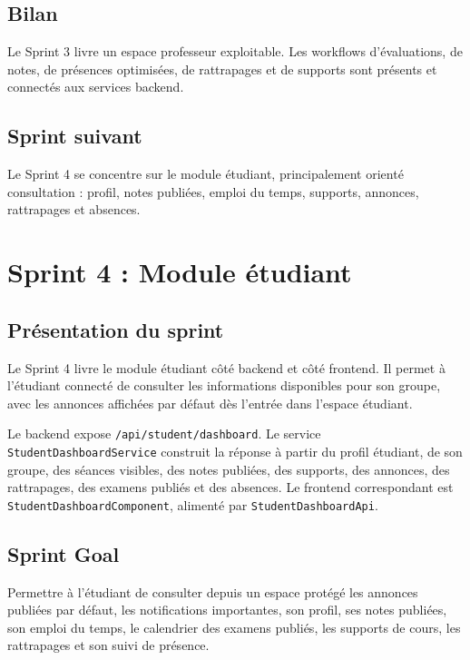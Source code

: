 \documentclass[12pt,a4paper]{report}
\begin{document}
\section{Bilan}

Le Sprint 3 livre un espace professeur exploitable. Les workflows d'évaluations, de notes, de présences optimisées, de rattrapages et de supports sont présents et connectés aux services backend.

\section{Sprint suivant}

Le Sprint 4 se concentre sur le module étudiant, principalement orienté consultation : profil, notes publiées, emploi du temps, supports, annonces, rattrapages et absences.

\chapter{Sprint 4 : Module étudiant}

\section{Présentation du sprint}

Le Sprint 4 livre le module étudiant côté backend et côté frontend. Il permet à l'étudiant connecté de consulter les informations disponibles pour son groupe, avec les annonces affichées par défaut dès l'entrée dans l'espace étudiant.

Le backend expose \texttt{/api/student/dashboard}. Le service \texttt{StudentDashboardService} construit la réponse à partir du profil étudiant, de son groupe, des séances visibles, des notes publiées, des supports, des annonces, des rattrapages, des examens publiés et des absences. Le frontend correspondant est \texttt{StudentDashboardComponent}, alimenté par \texttt{StudentDashboardApi}.

\section{Sprint Goal}

Permettre à l'étudiant de consulter depuis un espace protégé les annonces publiées par défaut, les notifications importantes, son profil, ses notes publiées, son emploi du temps, le calendrier des examens publiés, les supports de cours, les rattrapages et son suivi de présence.
\end{document}
